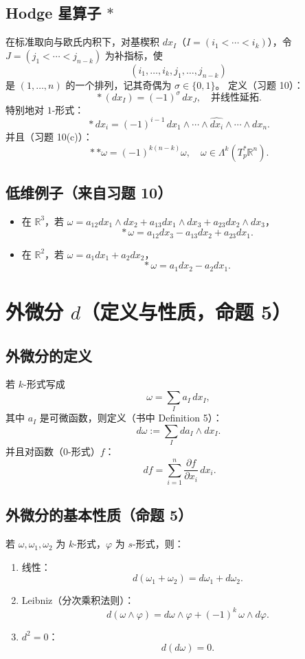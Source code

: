 \documentclass[11pt,a4paper]{article}
\newcommand{\R}{\mathbb{R}}
\begin{document}
\subsection{Hodge 星算子 \texorpdfstring{$\ast$}{*}}
在标准取向与欧氏内积下，对基楔积 $dx_I$（$I=(i_1<\cdots<i_k)$），令 $J=(j_1<\cdots<j_{n-k})$ 为补指标，使
\[
(i_1,\dots,i_k,j_1,\dots,j_{n-k})
\]
是 $(1,\dots,n)$ 的一个排列，记其奇偶为 $\sigma\in\{0,1\}$。
定义（习题 10）：
\[
\boxed{\ \ast(dx_I)=(-1)^\sigma\,dx_J,\quad\text{并线性延拓}.\ }
\]
特别地对 $1$-形式：
\[
\boxed{\ \ast dx_i = (-1)^{i-1}\,dx_1\wedge\cdots\wedge\widehat{dx_i}\wedge\cdots\wedge dx_n.\ }
\]
并且（习题 10(c)）：
\[
\boxed{\ \ast\ast\omega = (-1)^{k(n-k)}\omega,\quad \omega\in\Lambda^k(T_p^\ast\R^n).\ }
\]

\subsection{低维例子（来自习题 10）}
\begin{itemize}
  \item 在 $\R^3$，若 $\omega=a_{12}dx_1\wedge dx_2+a_{13}dx_1\wedge dx_3+a_{23}dx_2\wedge dx_3$，
  \[
  \boxed{\ \ast\omega = a_{12}dx_3 - a_{13}dx_2 + a_{23}dx_1. \ }
  \]
  \item 在 $\R^2$，若 $\omega=a_1dx_1+a_2dx_2$，
  \[
  \boxed{\ \ast\omega = a_1dx_2 - a_2dx_1. \ }
  \]
\end{itemize}

\section{外微分 \texorpdfstring{$d$}{d}（定义与性质，命题 5）}

\subsection{外微分的定义}
若 $k$-形式写成
\[
\omega=\sum_I a_I\,dx_I,
\]
其中 $a_I$ 是可微函数，则定义（书中 Definition 5）：
\[
\boxed{\ d\omega := \sum_I da_I\wedge dx_I.\ }
\]
并且对函数（$0$-形式）$f$：
\[
\boxed{\ df = \sum_{i=1}^n \frac{\partial f}{\partial x_i}\,dx_i. }
\]

\subsection{外微分的基本性质（命题 5）}
若 $\omega,\omega_1,\omega_2$ 为 $k$-形式，$\varphi$ 为 $s$-形式，则：
\begin{enumerate}[label=(\alph*)]
  \item 线性：
  \[
  \boxed{\ d(\omega_1+\omega_2)=d\omega_1+d\omega_2. }
  \]
  \item Leibniz（分次乘积法则）：
  \[
  \boxed{\ d(\omega\wedge\varphi)=d\omega\wedge\varphi + (-1)^k\,\omega\wedge d\varphi. }
  \]
  \item $d^2=0$：
  \[
  \boxed{\ d(d\omega)=0. }
  \]
\end{enumerate}
\end{document}
